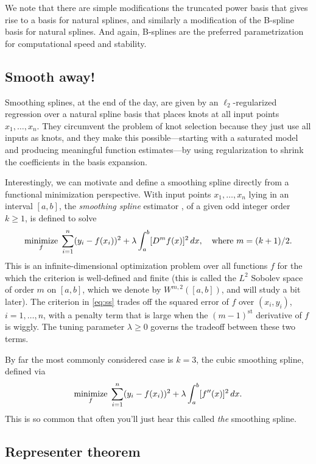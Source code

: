 \documentclass{article}
\begin{document}
We note that there are simple modifications the truncated power basis that gives
rise to a basis for natural splines, and similarly a modification of the
B-spline basis for natural splines. And again, B-splines are the preferred
parametrization for computational speed and stability. 

\subsection{Smooth away!}

Smoothing splines, at the end of the day, are given by an $\ell_2$-regularized
regression over a natural spline basis that places knots at all input points 
$x_1,\dots,x_n$. They circumvent the problem of knot selection because they
just use all inputs as knots, and they make this possible---starting with a 
saturated model and producing meaningful function estimates---by using
regularization to shrink the coefficients in the basis expansion.

Interestingly, we can motivate and define a smoothing spline directly from a
functional minimization perspective. With input points $x_1,\dots,x_n$ lying in 
an interval $[a,b]$, the \emph{smoothing spline} estimator \smash{$\hf$}, of a
given odd integer order $k \geq 1$, is defined to solve   
\begin{equation}
\label{eq:ss}
\mathop{\mathrm{minimize}}_f \; \sum_{i=1}^n (y_i - f(x_i))^2 + \lambda \int_a^b [D^m f(x)]^2 \,
dx, \quad \text{where $m=(k+1)/2$}.
\end{equation}
This is an infinite-dimensional optimization problem over all functions $f$ for
the which the criterion is well-defined and finite (this is called the $L^2$
Sobolev space of order $m$ on $[a,b]$, which we denote by $W^{m,2}([a,b])$, and
will study a bit later). The criterion in \eqref{eq:ss} trades off the squared
error of $f$ over $(x_i,y_i)$, $i=1,\dots,n$, with a penalty term that is large
when the $(m-1)^{\text{st}}$ derivative of $f$ is wiggly. The tuning parameter
$\lambda \geq 0$ governs the tradeoff between these two terms. 

By far the most commonly considered case is $k=3$, the cubic smoothing spline,
defined via 
\begin{equation}
\label{eq:ss_cubic}
\mathop{\mathrm{minimize}}_f \; \sum_{i=1}^n (y_i - f(x_i))^2 + \lambda \int_a^b [f''(x)]^2 \, dx.
\end{equation}
This is so common that often you'll just hear this called \emph{the} smoothing
spline. 

\subsection{Representer theorem}
\end{document}
